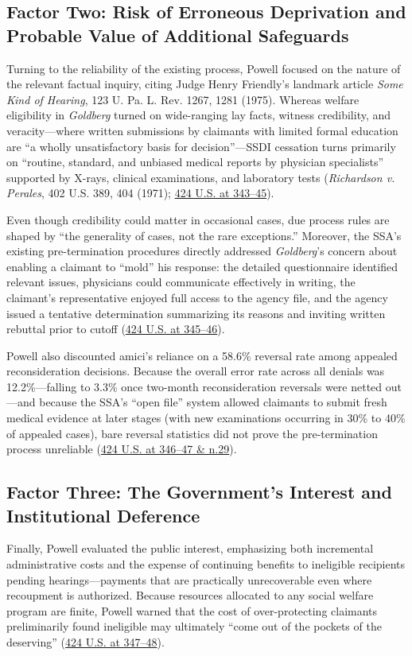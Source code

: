 \documentclass[12pt]{article}
\begin{document}
\subsection{Factor Two: Risk of Erroneous Deprivation and Probable Value of Additional Safeguards}
Turning to the reliability of the existing process, Powell focused on the nature of the relevant factual inquiry, citing Judge Henry Friendly's landmark article \emph{Some Kind of Hearing}, 123 U. Pa. L. Rev. 1267, 1281 (1975). Whereas welfare eligibility in \emph{Goldberg} turned on wide-ranging lay facts, witness credibility, and veracity---where written submissions by claimants with limited formal education are ``a wholly unsatisfactory basis for decision''---SSDI cessation turns primarily on ``routine, standard, and unbiased medical reports by physician specialists'' supported by X-rays, clinical examinations, and laboratory tests (\emph{Richardson v. Perales}, 402 U.S. 389, 404 (1971); \href{https://supreme.justia.com/cases/federal/us/424/319/}{424 U.S. at 343--45}).

Even though credibility could matter in occasional cases, due process rules are shaped by ``the generality of cases, not the rare exceptions.'' Moreover, the SSA's existing pre-termination procedures directly addressed \emph{Goldberg}'s concern about enabling a claimant to ``mold'' his response: the detailed questionnaire identified relevant issues, physicians could communicate effectively in writing, the claimant's representative enjoyed full access to the agency file, and the agency issued a tentative determination summarizing its reasons and inviting written rebuttal prior to cutoff (\href{https://supreme.justia.com/cases/federal/us/424/319/}{424 U.S. at 345--46}).

Powell also discounted amici's reliance on a 58.6\% reversal rate among appealed reconsideration decisions. Because the overall error rate across all denials was 12.2\%---falling to 3.3\% once two-month reconsideration reversals were netted out---and because the SSA's ``open file'' system allowed claimants to submit fresh medical evidence at later stages (with new examinations occurring in 30\% to 40\% of appealed cases), bare reversal statistics did not prove the pre-termination process unreliable (\href{https://supreme.justia.com/cases/federal/us/424/319/}{424 U.S. at 346--47 \& n.29}).

\subsection{Factor Three: The Government's Interest and Institutional Deference}
Finally, Powell evaluated the public interest, emphasizing both incremental administrative costs and the expense of continuing benefits to ineligible recipients pending hearings---payments that are practically unrecoverable even where recoupment is authorized. Because resources allocated to any social welfare program are finite, Powell warned that the cost of over-protecting claimants preliminarily found ineligible may ultimately ``come out of the pockets of the deserving'' (\href{https://supreme.justia.com/cases/federal/us/424/319/}{424 U.S. at 347--48}).
\end{document}
